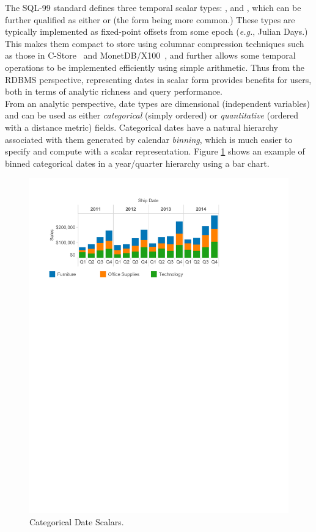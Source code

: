 The SQL-99 standard defines three temporal scalar types: ,  and , 
which can be further qualified as either  or   (the  form being more common.) 
These types are typically implemented as fixed-point offsets from some epoch (\textit{e.g.}, Julian Days.) 
This makes them compact to store using columnar compression techniques such as those in C-Store~\cite{Stonebraker:2005} and MonetDB/X100~\cite{Zukowski:2006}, 
and further allows some temporal operations to be implemented efficiently using simple arithmetic. 
Thus from the RDBMS perspective, representing dates in scalar form provides benefits for users, both in terms of analytic richness and query performance.\\

From an analytic perspective, date types are dimensional (\ie independent variables) and can be used as either \emph{categorical} (simply ordered) or \emph{quantitative} (ordered with a distance metric) fields.
Categorical dates have a natural hierarchy associated with them generated by calendar \emph{binning}, which is much easier to specify and compute with a scalar representation.
Figure \ref{fig:I1} shows an example of binned categorical dates in a year/quarter hierarchy using a bar chart.

\begin{figure}[ht]
\centering
\includegraphics[width=\columnwidth]{figures/FigureI1}
\caption{Categorical Date Scalars.}
\label{fig:I1}
\end{figure}

